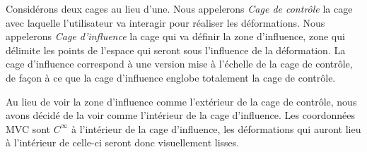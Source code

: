 Considérons deux cages au lieu d'une. Nous appelerons \textit{Cage de
contrôle} la cage avec laquelle l'utilisateur va interagir pour réaliser les
déformations. Nous appelerons \textit{Cage d'influence} la cage qui va définir
la zone d'influence, zone qui délimite les points de l'espace qui seront sous
l'influence de la déformation. La cage d'influence correspond à une version
mise à l'échelle de la cage de contrôle, de façon à ce que la cage d'influence
englobe totalement la cage de contrôle.

Au lieu de voir la zone d'influence comme l'extérieur de la cage de contrôle,
nous avons décidé de la voir comme l'intérieur de la cage d'influence. Les
coordonnées MVC sont $C^{\infty}$ à l'intérieur de la cage d'influence, les
déformations qui auront lieu à l'intérieur de celle-ci seront donc
visuellement lisses.





